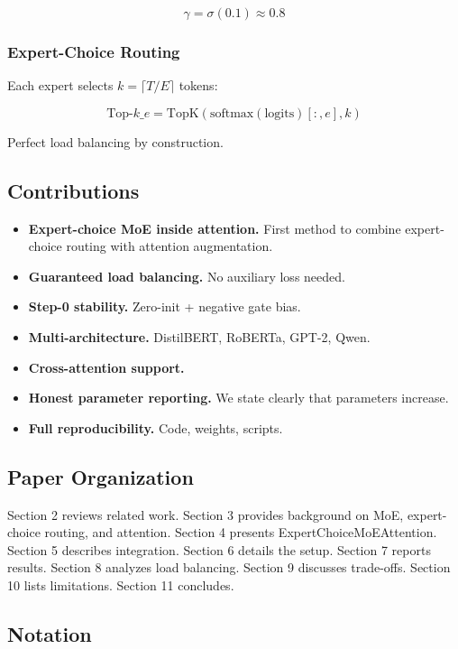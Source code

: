 \[
\gamma = \sigma(0.1) \approx 0.8
\tag{1.5}
\]

\subsubsection{Expert-Choice Routing}

Each expert selects $k = \lceil T / E \rceil$ tokens:

\[
\text{Top-}k\_e = \text{TopK}\!\left(\text{softmax}(\text{logits})[:, e], k\right)
\tag{1.6}
\]

Perfect load balancing by construction.

\subsection{Contributions}

\begin{itemize}
\item \textbf{Expert-choice MoE inside attention.} First method to combine expert-
  choice routing with attention augmentation.
\item \textbf{Guaranteed load balancing.} No auxiliary loss needed.
\item \textbf{Step-0 stability.} Zero-init + negative gate bias.
\item \textbf{Multi-architecture.} DistilBERT, RoBERTa, GPT-2, Qwen.
\item \textbf{Cross-attention support.}
\item \textbf{Honest parameter reporting.} We state clearly that parameters increase.
\item \textbf{Full reproducibility.} Code, weights, scripts.

\end{itemize}
\subsection{Paper Organization}

Section 2 reviews related work. Section 3 provides background on MoE, 
expert-choice routing, and attention. Section 4 presents 
ExpertChoiceMoEAttention. Section 5 describes integration. Section 6 details 
the setup. Section 7 reports results. Section 8 analyzes load balancing. 
Section 9 discusses trade-offs. Section 10 lists limitations. Section 11 
concludes.



\subsection{Notation}

